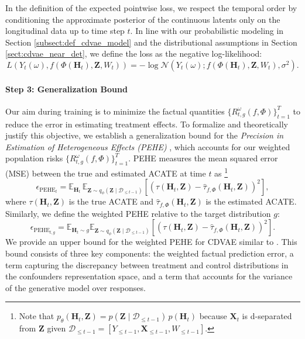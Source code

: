 \documentclass[10pt]{article} %
\begin{document}
In the definition of the expected pointwise loss, we respect the temporal order by conditioning the approximate posterior of the continuous latents only on the longitudinal data up to time step \( t \). In line with our probabilistic modeling in Section \ref{subsect:def_cdvae_model} and the distributional assumptions in Section \ref{sect:cdvae_near_det}, we define the loss as the negative log-likelihood:
\[
L\left( Y_t(\omega), f\left( \Phi(\mathbf{H}_t), \mathbf{Z}, W_t \right) \right) = -\log \mathcal{N}\left(Y_t(\omega); f\left( \Phi(\mathbf{H}_t), \mathbf{Z}, W_t \right), \sigma^2\right).
\]

\paragraph{Step 3: Generalization Bound} Our aim during training is to minimize the factual quantities $\{R_{t, g}^{\omega}(f, \Phi)\}_{t=1}^{T}$ to reduce the error in estimating treatment effects. To formalize and theoretically justify this objective, we establish a generalization bound for the \emph{Precision in Estimation of Heterogeneous Effects (PEHE)} \citep{hill2011bayesian}, which accounts for our weighted population risks $\{R_{t, g}^{\omega}(f, \Phi)\}_{t=1}^{T}$. PEHE measures the mean squared error (MSE) between the true and estimated ACATE at time $t$ as \footnote{Note that $p_{\theta}(\mathbf{H}_t, \mathbf{Z}) = p(\mathbf{Z} \mid \mathcal{D}_{\leq t-1}) \, p(\mathbf{H}_t)$ because $\mathbf{X}_t$ is d-separated from $\mathbf{Z}$ given $\mathcal{D}_{\leq t-1} = [Y_{\leq t-1}, \mathbf{X}_{\leq t-1}, W_{\leq t-1}]$.} 
\[
\epsilon_{\mathrm{PEHE}_t} = \mathbb{E}_{\mathbf{H}_t} \, \mathbb{E}_{\mathbf{Z} \sim q_{\phi}(\mathbf{Z} \mid \mathcal{D}_{\leq t-1})} \left[ \left( \tau(\mathbf{H}_t, \mathbf{Z}) - \hat{\tau}_{f, \Phi}(\mathbf{H}_t, \mathbf{Z}) \right)^2 \right],
\]
where $\tau(\mathbf{H}_t, \mathbf{Z})$ is the true ACATE and $\hat{\tau}_{f, \Phi}(\mathbf{H}_t, \mathbf{Z})$ is the estimated ACATE. Similarly, we define the weighted PEHE relative to the target distribution \( g \):
\[
\epsilon_{\mathrm{PEHE}_{t, g}} =  \mathbb{E}_{\mathbf{H}_t \sim g}\mathbb{E}_{\mathbf{Z} \sim q_{\phi}(\mathbf{Z} \mid \mathcal{D}_{\leq t-1})} \left[ \left( \tau(\mathbf{H}_t, \mathbf{Z}) - \hat{\tau}_{f, \Phi}(\mathbf{H}_t, \mathbf{Z}) \right)^2 \right].
\]
We provide an upper bound for the weighted PEHE for CDVAE similar to \citet{assaad2021counterfactual}. This bound consists of three key components: the weighted factual prediction error, a term capturing the discrepancy between treatment and control distributions in the confounders representation space, and a term that accounts for the variance of the generative model over responses.
\end{document}
